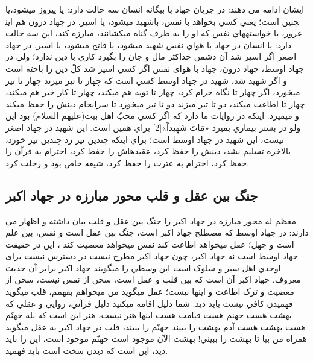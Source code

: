 ایشان ادامه می دهند:
در جريان جهاد با بيگانه انسان سه حالت دارد:
يا پيروز مي﻿شود،يا شهيد مي﻿شود، يا اسير.
در جهاد درون هم اين‎چنين است؛ يعني کسي بخواهد با نفس، با غرور، با خواسته﻿هاي نفس که او را به طرف گناه مي﻿کشانند، مبارزه کند، اين سه حالت دارد:
يا انسان در جهاد با هواي نفس شهيد مي﻿شود، يا فاتح مي﻿شود، يا اسير.
در جهاد اصغر اگر اسير شد آن دشمن حداکثر مال و جان را بگيرد کاري با دين ندارد؛ ولي در جهاد اوسط، جهاد درون، جهاد با هوای نفس اگر کسي اسير شد کلّ دين را باخته است و اگر شهيد شد، شهيد در جهاد اوسط کسي است که چهار تا تير مي﻿زند چهار تا تير مي﻿خورد، اگر چهار تا نگاه حرام کرد، چهار تا توبه هم مي﻿کند، چهار تا کار خير هم مي﻿کند، چهار تا اطاعت مي﻿کند، دو تا تير مي﻿زند دو تا تير مي﻿خورد تا سرانجام دينش را حفظ مي﻿کند و مي﻿ميرد. اينکه در روايات ما دارد که اگر کسي محبّ اهل بيت(عليهم السلام) بود اين ولو در بستر بيماري بميرد «مَاتَ شَهِيداً»[2] براي همين است. اين شهيد در جهاد اصغر نيست، اين شهيد در جهاد اوسط است؛ براي اينکه چندين تير زد چندين تير خورد، بالاخره تسليم نشد، دينش را حفظ کرد، عقيده﻿اش را حفظ کرد، احترام به قرآن را حفظ کرد، احترام به عترت را حفظ کرد، شيعه خاص بود و رحلت کرد.

\subsection{جنگ بين عقل و قلب محور مبارزه در جهاد اکبر}
معظم له محور مبارزه در جهاد اکبر را جنگ بین عقل و قلب بیان داشته و اظهار می دارند:
در جهاد اوسط که مصطلح جهاد اکبر است، جنگ بين عقل است و نفس، بين علم است و جهل؛ عقل مي﻿خواهد اطاعت کند نفس مي﻿خواهد معصيت کند ، اين در حقيقت جهاد اوسط است نه جهاد اکبر، چون جهاد اکبر مطرح نيست در دسترس نيست برای اوحدي اهل سير و سلوک است اين وسطي را مي﻿گويند جهاد اکبر برابر آن حديث معروف. جهاد اکبر آن است که بين قلب و عقل است، سخن از نفس نيست، سخن از معصيت و ترک اطاعت و اينها نيست؛ عقل مي﻿گويد من مي﻿خواهم بفهمم، قلب مي﻿گويد فهميدن کافي نيست بايد ديد. شما دليل اقامه مي﻿کنيد دليل قرآني، روايي و عقلي که بهشت هست جهنم هست قيامت هست اينها هنر نيست، هنر اين است که بله جهنّم هست بهشت هست آدم بهشت را ببيند جهنّم را ببيند، قلب در جهاد اکبر به عقل مي﻿گويد همراه من بيا تا بهشت را ببيني! بهشت الآن موجود است جهنّم موجود است، اين را بايد ديد، اين است که ديدن سخت است بايد فهميد.


